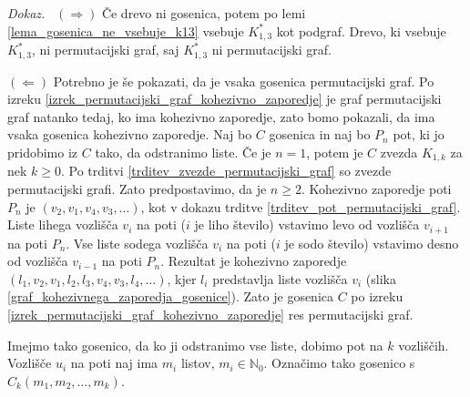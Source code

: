\documentclass[a4paper, 12pt]{book}
\newenvironment{dokaz}{\emph{Dokaz.}\ }{\hspace{\fill}{$\Box$}}
\begin{document}
\begin{dokaz}
    $(\Rightarrow)$ Če drevo ni gosenica, potem po lemi \ref{lema_gosenica_ne_vsebuje_k13} vsebuje $K_{1,3}^*$ kot podgraf. Drevo, ki vsebuje $K_{1,3}^*$, ni permutacijski graf, saj $K_{1,3}^*$ ni permutacijski graf. 
    
    $(\Leftarrow)$ Potrebno je še pokazati, da je vsaka gosenica permutacijski graf. 
    Po izreku \ref{izrek_permutacijski_graf_kohezivno_zaporedje} je graf permutacijski graf natanko tedaj, ko ima kohezivno zaporedje, zato bomo pokazali, da ima vsaka gosenica kohezivno zaporedje. Naj bo $C$ gosenica in naj bo $P_n$ pot, ki jo pridobimo iz $C$ tako, da odstranimo liste. Če je $n=1$, potem je $C$ zvezda $K_{1,k}$ za nek $k \geq 0$. Po trditvi \ref{trditev_zvezde_permutacijski_graf} so zvezde permutacijski grafi. Zato predpostavimo, da je $n \geq 2$. Kohezivno zaporedje poti $P_n$ je $(v_2, v_1, v_4, v_3, \dots)$, kot v dokazu trditve \ref{trditev_pot_permutacijski_graf}. Liste lihega vozlišča $v_i$ na poti ($i$ je liho število) vstavimo levo od vozlišča $v_{i+1}$ na poti $P_n$. Vse liste sodega vozlišča $v_i$ na poti ($i$ je sodo število) vstavimo desno od vozlišča $v_{i-1}$ na poti $P_n$. Rezultat je kohezivno zaporedje $(l_1, v_2, v_1, l_2, l_3, v_4, v_3, l_4, \dots)$, kjer $l_i$ predstavlja liste vozlišča $v_i$ (slika \ref{graf_kohezivnega_zaporedja_gosenice}). Zato je gosenica $C$ po izreku \ref{izrek_permutacijski_graf_kohezivno_zaporedje} res permutacijski graf.    
\end{dokaz}

Imejmo tako gosenico, da ko ji odstranimo vse liste, dobimo pot na $k$ vozliščih. Vozlišče $u_i$ na poti naj ima $m_i$ listov, $m_i \in \mathbb{N}_0$. Označimo tako gosenico s $C_k(m_1, m_2, \dots, m_k)$.
\end{document}
